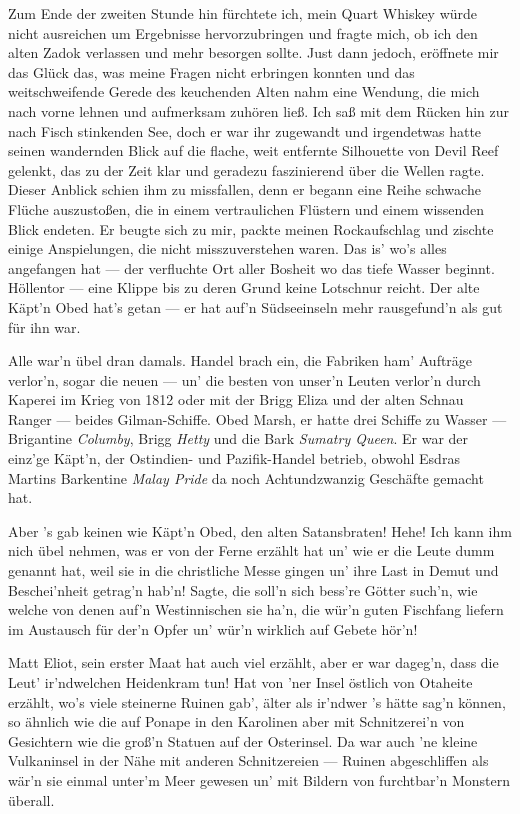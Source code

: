 Zum Ende der zweiten Stunde hin fürchtete ich, mein Quart Whiskey würde nicht ausreichen um Ergebnisse hervorzubringen und fragte mich, ob ich den alten Zadok verlassen und mehr besorgen sollte. Just dann jedoch, eröffnete mir das Glück das, was meine Fragen nicht erbringen konnten und das weitschweifende Gerede des keuchenden Alten nahm eine Wendung, die mich nach vorne lehnen und aufmerksam zuhören ließ. Ich saß mit dem Rücken hin zur nach Fisch stinkenden See, doch er war ihr zugewandt und irgendetwas hatte seinen wandernden Blick auf die flache, weit entfernte Silhouette von Devil Reef gelenkt, das zu der Zeit klar und geradezu faszinierend über die Wellen ragte. Dieser Anblick schien ihm zu missfallen, denn er begann eine Reihe schwache Flüche auszustoßen, die in einem vertraulichen Flüstern und einem wissenden Blick endeten. Er beugte sich zu mir, packte meinen Rockaufschlag und zischte einige Anspielungen, die nicht misszuverstehen waren.
\glqq Das is' wo's alles angefangen hat --- der verfluchte Ort aller Bosheit wo das tiefe Wasser beginnt. Höllentor --- eine Klippe bis zu deren Grund keine Lotschnur reicht. Der alte Käpt'n Obed hat's getan --- er hat auf'n Südseeinseln mehr rausgefund'n als gut für ihn war.

Alle war'n übel dran damals. Handel brach ein, die Fabriken ham' Aufträge verlor'n, sogar die neuen --- un' die besten von unser'n Leuten verlor'n durch Kaperei im Krieg von 1812 oder mit der Brigg Eliza und der alten Schnau Ranger --- beides Gilman-Schiffe. Obed Marsh, er hatte drei Schiffe zu Wasser --- Brigantine \textit{Columby}, Brigg \textit{Hetty} und die Bark \textit{Sumatry Queen}. Er war der einz'ge Käpt'n, der Ostindien- und Pazifik-Handel betrieb, obwohl Esdras Martins Barkentine \textit{Malay Pride} da noch Achtundzwanzig Geschäfte gemacht hat.

Aber 's gab keinen wie Käpt'n Obed, den alten Satansbraten! Hehe! Ich kann ihm nich übel nehmen, was er von der Ferne erzählt hat un' wie er die Leute dumm genannt hat, weil sie in die christliche Messe gingen un' ihre Last in Demut und Beschei'nheit getrag'n hab'n! Sagte, die soll'n sich bess're Götter such'n, wie welche von denen auf'n Westinnischen sie ha'n, die wür'n guten Fischfang liefern im Austausch für der'n Opfer un' wür'n wirklich auf Gebete hör'n!

Matt Eliot, sein erster Maat hat auch viel erzählt, aber er war dageg'n, dass die Leut' ir'ndwelchen Heidenkram tun! Hat von 'ner Insel östlich von Otaheite erzählt, wo's viele steinerne Ruinen gab', älter als ir'ndwer 's hätte sag'n können, so ähnlich wie die auf Ponape in den Karolinen aber mit Schnitzerei'n von Gesichtern wie die groß'n Statuen auf der Osterinsel. Da war auch 'ne kleine Vulkaninsel in der Nähe mit anderen Schnitzereien --- Ruinen abgeschliffen als wär'n sie einmal unter'm Meer gewesen un' mit Bildern von furchtbar'n Monstern überall.


